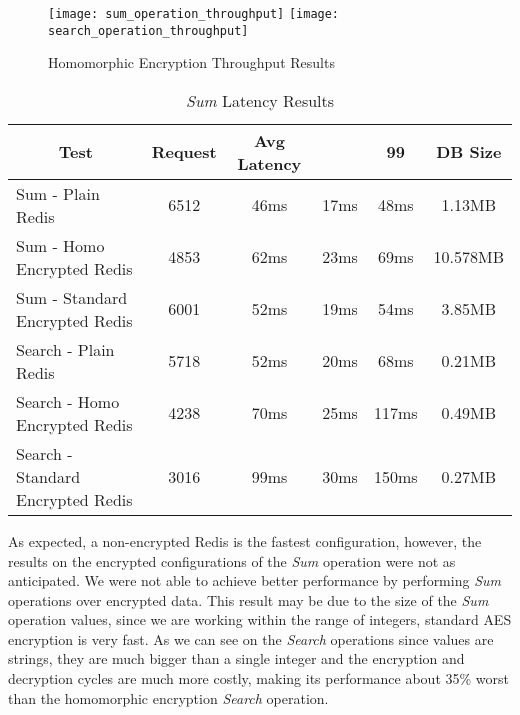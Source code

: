\begin{figure}[htbp]
  \centering
    {\texttt{[image: sum\_operation\_throughput]}}%
    {\texttt{[image: search\_operation\_throughput]}}%
  \caption{Homomorphic Encryption Throughput Results}
  \label{fig:homomorphic_encryption_throughput_results}
\end{figure}

\begin{table}[ht]
	\caption{\textit{Sum} Latency Results}
	\label{tab:sum_latency_results}
\centering
\begin{tabular}{lccccc}
	\toprule
	\multicolumn{1}{c}{\textbf{Test}} & \pmb{\#}\textbf{Request} & \textbf{Avg Latency} & \pmb{\ensuremath{\sigma}} & \textbf{99}\pmb{\%} & \textbf{DB Size} \\
	\midrule
		Sum - Plain Redis & 6512 & 46ms & 17ms & 48ms & 1.13MB  					\\
		Sum - Homo Encrypted Redis & 4853 & 62ms & 23ms & 69ms & 10.578MB  		\\
		Sum - Standard Encrypted Redis & 6001 & 52ms & 19ms & 54ms & 3.85MB  	\\
		Search - Plain Redis & 5718 & 52ms & 20ms & 68ms & 0.21MB				\\
		Search - Homo Encrypted Redis & 4238	 & 70ms & 25ms & 117ms & 0.49MB		\\
		Search - Standard Encrypted Redis & 3016	 & 99ms & 30ms & 150ms & 0.27MB	\\
	\bottomrule
\end{tabular}
\end{table}

As expected, a non-encrypted Redis is the fastest configuration, however, the results on the encrypted configurations of the \textit{Sum} operation were not as anticipated. We were not able to achieve better performance by performing \textit{Sum} operations over encrypted data. This result may be due to the size of the \textit{Sum} operation values, since we are working within the range of integers, standard \gls{AES} encryption is very fast. As we can see on the \textit{Search} operations since values are strings, they are much bigger than a single integer and the encryption and decryption cycles are much more costly, making its performance about 35\% worst than the homomorphic encryption \textit{Search} operation.

